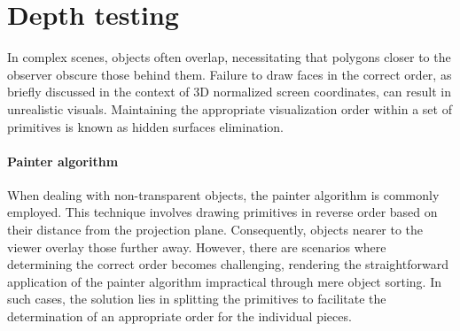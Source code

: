 \section{Depth testing}

In complex scenes, objects often overlap, necessitating that polygons closer to the observer obscure those behind them.
Failure to draw faces in the correct order, as briefly discussed in the context of 3D normalized screen coordinates, can result in unrealistic visuals.
Maintaining the appropriate visualization order within a set of primitives is known as hidden surfaces elimination.

\paragraph*{Painter algorithm}
When dealing with non-transparent objects, the painter algorithm is commonly employed.
This technique involves drawing primitives in reverse order based on their distance from the projection plane.
Consequently, objects nearer to the viewer overlay those further away.
However, there are scenarios where determining the correct order becomes challenging, rendering the straightforward application of the painter algorithm impractical through mere object sorting.
In such cases, the solution lies in splitting the primitives to facilitate the determination of an appropriate order for the individual pieces.


